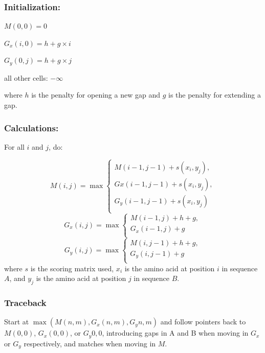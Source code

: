\documentclass{article}
\begin{document}
\subsubsection*{Initialization:}
\indent\indent
$M(0,0) = 0$

$G_{x}(i,0) = h + g \times i$

$G_{y}(0,j) = h + g \times j$

all other cells: $-\infty$

where $h$ is the penalty for opening a new gap and $g$ is the penalty for extending a gap.

\subsubsection*{Calculations:}

For all $i$ and $j$, do:

\begin{equation}
M(i,j) = \max 
	\begin{cases}
		M(i-1,j-1) + s(x_{i}, y_{j}),\\
		G{x}(i-1,j-1) + s(x_{i}, y_{j}),\\
		G_{y}(i-1,j-1) + s(x_{i}, y_{j})\\
	\end{cases}
\end{equation}
\begin{equation}
G_{x}(i,j) = \max
	\begin{cases}
		M(i-1,j) + h + g, \\
		G_{x}(i-1,j) + g\\
	\end{cases}
\end{equation}
\begin{equation}
G_{y}(i,j) = \max
	\begin{cases}
		M(i,j-1) + h + g, \\
		G_{y}(i,j-1) + g\\
	\end{cases}
\end{equation}
where $s$ is the scoring matrix used, $x_{i}$ is the amino acid at position $i$ in sequence $A$, and $y_{j}$ is the amino acid at position $j$ in sequence $B$.

\subsubsection*{Traceback}
Start at $\max(M(n,m), G_{x}(n,m), G_y{n,m})$ and follow pointers back to $M(0,0)$, $G_{x}(0,0)$, or $G_y{0,0}$, introducing gaps in A and B when moving in $G_{x}$ or $G_{y}$ respectively, and matches when moving in $M$.
\end{document}
